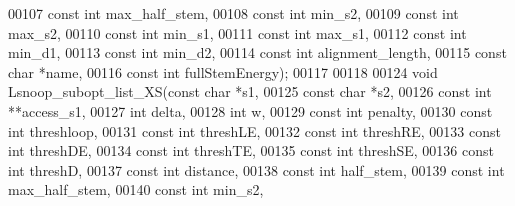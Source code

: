 \begin{DoxyCode}
00107                         \textcolor{keyword}{const} \textcolor{keywordtype}{int}   max\_half\_stem,
00108                         \textcolor{keyword}{const} \textcolor{keywordtype}{int}   min\_s2,
00109                         \textcolor{keyword}{const} \textcolor{keywordtype}{int}   max\_s2,
00110                         \textcolor{keyword}{const} \textcolor{keywordtype}{int}   min\_s1,
00111                         \textcolor{keyword}{const} \textcolor{keywordtype}{int}   max\_s1,
00112                         \textcolor{keyword}{const} \textcolor{keywordtype}{int}   min\_d1,
00113                         \textcolor{keyword}{const} \textcolor{keywordtype}{int}   min\_d2,
00114                         \textcolor{keyword}{const} \textcolor{keywordtype}{int}   alignment\_length,
00115                         \textcolor{keyword}{const} \textcolor{keywordtype}{char}  *name,
00116                         \textcolor{keyword}{const} \textcolor{keywordtype}{int}   fullStemEnergy);
00117 
00118 
00124 \textcolor{keywordtype}{void} Lsnoop\_subopt\_list\_XS(\textcolor{keyword}{const} \textcolor{keywordtype}{char} *s1,
00125                            \textcolor{keyword}{const} \textcolor{keywordtype}{char} *s2,
00126                            \textcolor{keyword}{const} \textcolor{keywordtype}{int}  **access\_s1,
00127                            \textcolor{keywordtype}{int}        delta,
00128                            \textcolor{keywordtype}{int}        w,
00129                            \textcolor{keyword}{const} \textcolor{keywordtype}{int}  penalty,
00130                            \textcolor{keyword}{const} \textcolor{keywordtype}{int}  threshloop,
00131                            \textcolor{keyword}{const} \textcolor{keywordtype}{int}  threshLE,
00132                            \textcolor{keyword}{const} \textcolor{keywordtype}{int}  threshRE,
00133                            \textcolor{keyword}{const} \textcolor{keywordtype}{int}  threshDE,
00134                            \textcolor{keyword}{const} \textcolor{keywordtype}{int}  threshTE,
00135                            \textcolor{keyword}{const} \textcolor{keywordtype}{int}  threshSE,
00136                            \textcolor{keyword}{const} \textcolor{keywordtype}{int}  threshD,
00137                            \textcolor{keyword}{const} \textcolor{keywordtype}{int}  distance,
00138                            \textcolor{keyword}{const} \textcolor{keywordtype}{int}  half\_stem,
00139                            \textcolor{keyword}{const} \textcolor{keywordtype}{int}  max\_half\_stem,
00140                            \textcolor{keyword}{const} \textcolor{keywordtype}{int}  min\_s2,

\end{DoxyCode}
